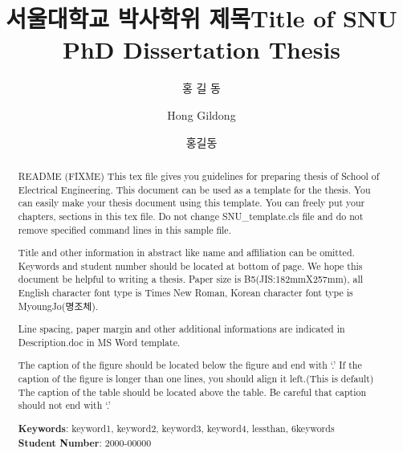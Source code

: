 \documentclass[doctor]{snuee}
\title[korean]{서울대학교 박사학위 제목}                %
\title[english]{Title of SNU PhD Dissertation Thesis} %
\author[korean]{홍 길 동}      %
\author[english]{Hong Gildong} %
\author[nospace]{홍길동}       %
\begin{document}
\renewcommand{\baselinestretch}{1.5}    %
\selectfont                             

\begin{abstract}
	\par %
	README (FIXME)
	This tex file gives you guidelines for preparing thesis of School of Electrical Engineering.
	This document can be used as a template for the thesis.
	You can easily make your thesis document using this template. You can freely put your chapters,
	sections in this tex file.
	Do not change SNU\_template.cls file and do not remove specified
	command lines in this sample file.

	Title and other information in abstract like name and affiliation can be
	omitted. Keywords and student number should be located at bottom of
	page. We hope this document be helpful to writing a thesis. Paper
	size is B5(JIS:182mmX257mm), all English character font type is
	Times New Roman, Korean character font type is MyoungJo(명조체).

	Line spacing, paper margin and other additional informations are
	indicated in Description.doc in MS Word template.

	The caption of the figure should be located below the figure and end with `.'
	If the caption of the figure is longer than one lines, you should align it left.(This is default)
	The caption of the table should be located above the table. Be careful that caption should not end with `.'
	\vfill
	\begin{minipage}[t][20mm][b]{\textwidth}
		{\bfseries Keywords}: keyword1, keyword2, keyword3, keyword4, lessthan, 6keywords \\ %
		{\bfseries Student Number}: 2000-00000\\                        %
	\end{minipage}
	
\end{abstract}

\changepage{5mm}{}{}{}{}{}{}{}{-5mm}    %
\makelists   %

\end{document}
